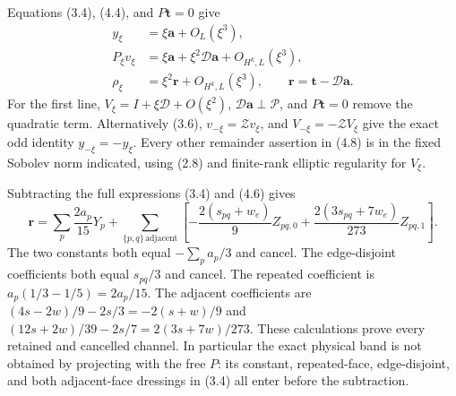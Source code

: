 \documentclass[
  11pt,
]{article}
\begin{document}
Equations (3.4), (4.4), and \(P\mathbf t=0\) give \[
\begin{split}
 y_\xi&=\xi\mathbf a+O_L(\xi^3),\\
 P_\xi v_\xi&=\xi\mathbf a+\xi^2\mathscr D\mathbf a
                             +O_{H^k,L}(\xi^3),\\
 \rho_\xi&=\xi^2\mathbf r+O_{H^k,L}(\xi^3),
 \qquad \mathbf r=\mathbf t-\mathscr D\mathbf a.
\end{split}
\tag{4.8}
\] For the first line, \(V_\xi=I+\xi\mathscr D+O(\xi^2)\),
\(\mathscr D\mathbf a\perp\mathcal P\), and \(P\mathbf t=0\) remove the
quadratic term. Alternatively (3.6), \(v_{-\xi}=\mathcal Z v_\xi\), and
\(V_{-\xi}=-\mathcal ZV_\xi\) give the exact odd identity
\(y_{-\xi}=-y_\xi\). Every other remainder assertion in (4.8) is in the
fixed Sobolev norm indicated, using (2.8) and finite-rank elliptic
regularity for \(V_\xi\).

Subtracting the full expressions (3.4) and (4.6) gives \[
\boxed{
 \mathbf r=\sum_p\frac{2a_p}{15}Y_p
 +\sum_{\{p,q\}\,\text{adjacent}}
   \left[-\frac{2(s_{pq}+w_e)}9Z_{pq,0}
         +\frac{2(3s_{pq}+7w_e)}{273}Z_{pq,1}\right].}
\tag{4.9}
\] The two constants both equal \(-\sum_pa_p/3\) and cancel. The
edge-disjoint coefficients both equal \(s_{pq}/3\) and cancel. The
repeated coefficient is \(a_p(1/3-1/5)=2a_p/15\). The adjacent
coefficients are \((4s-2w)/9-2s/3=-2(s+w)/9\) and
\((12s+2w)/39-2s/7=2(3s+7w)/273\). These calculations prove every
retained and cancelled channel. In particular the exact physical band is
not obtained by projecting with the free \(P\): its constant,
repeated-face, edge-disjoint, and both adjacent-face dressings in (3.4)
all enter before the subtraction.
\end{document}
